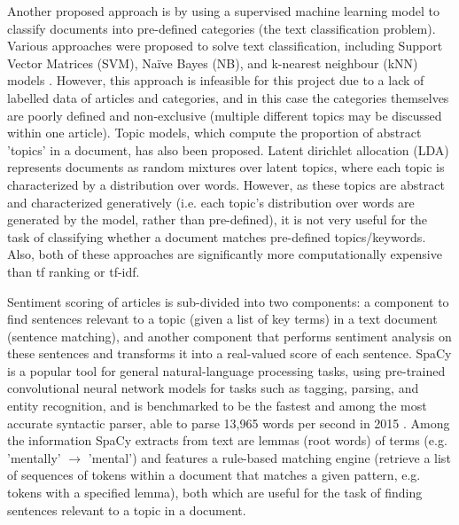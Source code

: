 \documentclass{report}
\begin{document}
Another proposed approach is by using a supervised machine learning model to classify documents into pre-defined categories (the text classification problem).
Various approaches were proposed to solve text classification, including Support Vector Matrices (SVM), Na\"{i}ve Bayes (NB), and k-nearest neighbour (kNN) models \cite{khan2010review}.
However, this approach is infeasible for this project due to a lack of labelled data of articles and categories, and in this case the categories themselves are poorly defined and non-exclusive (multiple different topics may be discussed within one article).
Topic models, which compute the proportion of abstract 'topics' in a document, has also been proposed.
Latent dirichlet allocation (LDA) \cite{blei2003latent} represents documents as random mixtures over latent topics, where each topic is characterized by a distribution over words.
However, as these topics are abstract and characterized generatively (i.e. each topic's distribution over words are generated by the model, rather than pre-defined), it is not very useful for the task of classifying whether a document matches pre-defined topics/keywords.
Also, both of these approaches are significantly more computationally expensive than tf ranking or tf-idf.

Sentiment scoring of articles is sub-divided into two components: a component to find sentences relevant to a topic (given a list of key terms) in a text document (sentence matching), and another component that performs sentiment analysis on these sentences and transforms it into a real-valued score of each sentence. 
SpaCy \cite{SpaCy} is a popular tool for general natural-language processing tasks, using pre-trained convolutional neural network models for tasks such as tagging, parsing, and entity recognition, and is benchmarked to be the fastest and among the most accurate syntactic parser, able to parse 13,965 words per second in 2015 \cite{choi2015depends}.
Among the information SpaCy extracts from text are lemmas (root words) of terms (e.g. 'mentally' $\rightarrow$ 'mental') and features a rule-based matching engine (retrieve a list of sequences of tokens within a document that matches a given pattern, e.g. tokens with a specified lemma), both which are useful for the task of finding sentences relevant to a topic in a document.
\end{document}
